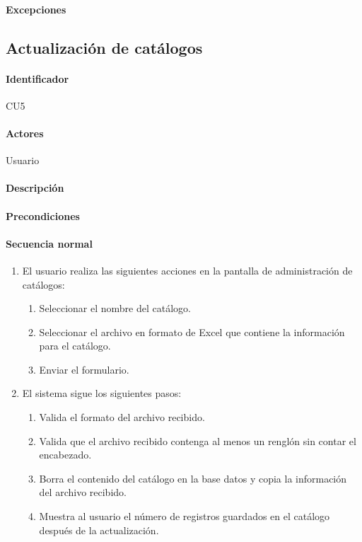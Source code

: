 \paragraph{Excepciones}


\subsection{Actualización de catálogos}
\paragraph{Identificador}
CU5
\paragraph{Actores}
Usuario
\paragraph{Descripción}
\paragraph{Precondiciones}
\paragraph{Secuencia normal}
\begin{enumerate}
  \item El usuario realiza las siguientes acciones en la pantalla de administración de catálogos:
  \begin{enumerate}
    \item Seleccionar el nombre del catálogo.
    \item Seleccionar el archivo en formato de Excel que contiene la información para el catálogo.
    \item Enviar el formulario.
  \end{enumerate}
  \item El sistema sigue los siguientes pasos:
  \begin{enumerate}
    \item Valida el formato del archivo recibido.
    \item Valida que el archivo recibido contenga al menos un renglón sin contar el encabezado.
    \item Borra el contenido del catálogo en la base datos y copia la información del archivo recibido.
    \item Muestra al usuario el número de registros guardados en el catálogo después de la actualización.
  \end{enumerate}
\end{enumerate}
